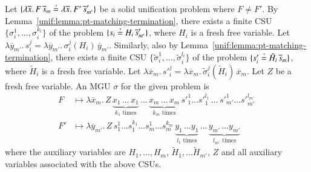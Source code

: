 \begin{lemma}
  \label{unif:lemma:solid-vars-diff-mgu}
  Let 
  $\{\lambda \overline{x}.\, F \, \overline{s}_m \unif \lambda\overline{x}.\, F' \, \overline{s}'_{m'}\}$
  be a solid unification problem
  where $F \neq F'$.
  By Lemma~\ref{unif:lemma:pt-matching-termination}, there exists a finite CSU $\{\sigma_i^1, \dots, \sigma_i^{k_i} \}$
  of the problem $\{s_i \unif H_i \, \overline{s}'_{m'}\}$, 
  where $H_i$ is a fresh free variable.
  Let 
  $\lambda\overline{y}_{m'}. \, s_i^j = \lambda\overline{y}_{m'}. \, \sigma_i^j(H_i) \,\overline{y}_{m'}$.
  Similarly, also by Lemma~\ref{unif:lemma:pt-matching-termination}, 
  there exists a finite CSU $\{ \tilde\sigma_i^1, \dots, \tilde\sigma_i^{l_i} \}$
  of the problem $\{s'_i \unif \tilde H_i \, \overline{s}_m\}$, where $\tilde H_i$
  is a fresh free variable. 
  Let 
  $\lambda \overline{x}_m. \, {s'}_i^j = \lambda \overline{x}_m. \, \tilde\sigma_i^j(\tilde H_i) \, \overline{x}_m$.
  Let $Z$ be a fresh free variable.
  An MGU $\sigma$ for the given problem is
    \begin{align*} 
      F &\mapsto \lambda \overline{x}_m.\, Z
          \, \underbrace{x_1 \, \ldots \, x_1}_{k_1 \text{ times}} \, \ldots \,
             \underbrace{x_m \, \ldots \, x_m}_{k_m \text{ times}} 
             \, {s'}_1^1 \ldots {s'}_1^{l_1} \, \ldots \, {s'}_{m'}^1 \ldots {s'}_{m'}^{l_{m'}} \, \\
      F' &\mapsto \lambda \overline{y}_{m'}. \, Z
          \, s_1^1 \ldots s_1^{k_1} \ldots s_m^1 \ldots s_m^{k_m} \,
      \underbrace{y_1 \, \ldots y_1}_{l_1 \text{ times}} \, \ldots \,
      \underbrace{y_{m'} \, \ldots y_{m'}}_{l_{m'} \text{ times}}
    \end{align*}
  where the auxiliary variables are $H_1, \dots, H_m$, $\tilde H_1, \dots \tilde H_{m'}$, $Z$ and all auxiliary variables associated with the above CSUs.
\end{lemma}
